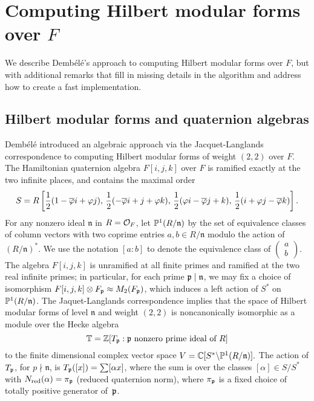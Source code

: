 \documentclass{amsart}
\newcommand{\n}{\mathfrak{n}}
\newcommand{\dembele}{Demb\'el{\'e}\xspace}
\begin{document}
\section{Computing Hilbert modular forms over $F$}\label{sec:hmf}

We describe \dembele's approach to computing Hilbert modular forms over
$F$, but with additional remarks that fill in missing details in the
algorithm and address how to create a fast implementation.

\subsection{Hilbert modular forms and quaternion 
algebras}\label{sec:dembele}
\dembele \cite{dembele:hilbert5} introduced an algebraic approach via
the Jacquet-Langlands correspondence to computing Hilbert modular
forms of weight $(2,2)$ over $F$.  The Hamiltonian quaternion algebra
$F[i,j,k]$ over $F$ is ramified exactly at the two infinite places,
and contains the maximal order
$$
 S = R\left[\frac{1}{2}(1-\overline{\varphi} i + \varphi j),\,
       \frac{1}{2}(-\overline{\varphi} i + j + \varphi k),\,
       \frac{1}{2}(\varphi i - \overline{\varphi} j + k), \,
       \frac{1}{2}(i + \varphi j - \overline{\varphi} k)\right].
$$
For any nonzero ideal $\n$ in $R=\mathcal{O}_F$,
let $\P^1(R/\n)$ by the set of equivalence classes of
 column vectors with two coprime entries $a,b \in R/\n$ modulo the
 action of $(R/\n)^*$.  We use the notation $[a:b]$
to denote the equivalence class of 
$\left(\begin{smallmatrix}a\\b\end{smallmatrix}\right)$.
The algebra $F[i,j,k]$ is unramified at all finite primes and ramified
at the two real infinite primes; in
particular, for each prime $\p\mid \n$, we may fix a choice of isomorphism
$F[i,j,k]\otimes F_{\mathfrak{p}} \approx M_2(F_{\mathfrak{p}})$, which induces a left
action of $S^*$ on $\P^1(R/\n)$. The Jaquet-Langlands correspondence implies that
the space of Hilbert modular forms of level $\n$ and weight $(2,2)$ is
noncanonically isomorphic as a module over the Hecke algebra
$$\mathbb{T}=\mathbb{Z}[T_{\mathfrak{p}} :  \mathfrak{p} \text{ nonzero prime ideal of }R]$$ 
to the finite dimensional complex vector space $ V = \C[S^* \backslash
\P^1(R/\n)].  $ The action of $T_{\mathfrak{p}}$, for $p\nmid \n$, is
$T_{\mathfrak{p}}([x]) = \sum [\alpha x]$, where the sum is over the classes
$[\alpha]\in S/S^*$ with $N_{\text{red}}(\alpha)=\pi_{\mathfrak{p}}$ (reduced quaternion norm),
where $\pi_{\mathfrak{p}}$ is a fixed choice of totally positive generator of~$\mathfrak{p}$.
\end{document}
